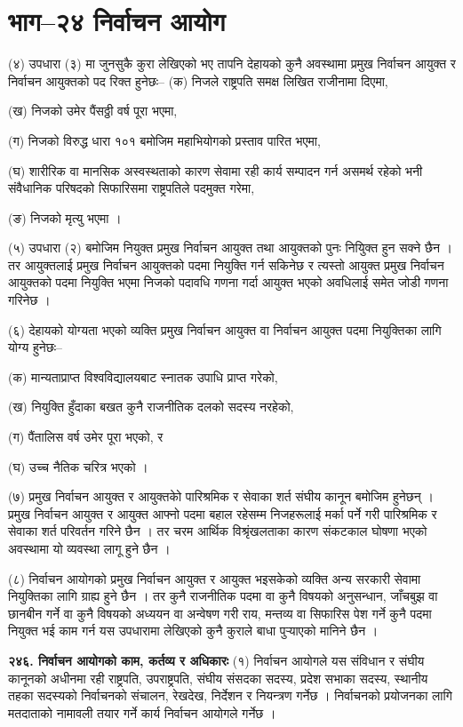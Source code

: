 \section{भाग–२४ निर्वाचन आयोग}

(४) उपधारा (३) मा जुनसुकै कुरा लेखिएको भए तापनि देहायको कुनै अवस्थामा प्रमुख निर्वाचन आयुक्त र निर्वाचन आयुक्तको पद रिक्त हुनेछः–
(क) निजले राष्ट्रपति समक्ष लिखित राजीनामा दिएमा,

(ख) निजको उमेर पैंसठ्ठी वर्ष पूरा भएमा,

(ग) निजको विरुद्ध धारा १०१ बमोजिम महाभियोगको प्रस्ताव पारित भएमा,

(घ) शारीरिक वा मानसिक अस्वस्थताको कारण सेवामा रही कार्य सम्पादन गर्न असमर्थ रहेको भनी संवैधानिक परिषदको
सिफारिसमा राष्ट्रपतिले पदमुक्त गरेमा,

(ङ) निजको मृत्यु भएमा ।

(५) उपधारा (२) बमोजिम नियुक्त प्रमुख निर्वाचन आयुक्त तथा आयुक्तको पुनः नियुिक्त हुन सक्ने छैन ।
तर आयुक्तलाई प्रमुख निर्वाचन आयुक्तको पदमा नियुक्ति गर्न सकिनेछ र त्यस्तो आयुक्त प्रमुख निर्वाचन आयुक्तको पदमा नियुक्ति भएमा निजको पदावधि गणना गर्दा आयुक्त भएको अवधिलाई समेत जोडी गणना गरिनेछ ।

(६) देहायको योग्यता भएको व्यक्ति प्रमुख निर्वाचन आयुक्त वा निर्वाचन आयुक्त पदमा नियुक्तिका लागि योग्य हुनेछः–

(क) मान्यताप्राप्त विश्वविद्यालयबाट स्नातक उपाधि प्राप्त गरेको,

(ख) नियुक्ति हुँदाका बखत कुनै राजनीतिक दलको सदस्य नरहेको,

(ग) पैंतालिस वर्ष उमेर पूरा भएको, र

(घ) उच्च नैतिक चरित्र भएको ।

(७) प्रमुख निर्वाचन आयुक्त र आयुक्तकोे पारिश्रमिक र सेवाका शर्त संघीय कानून बमोजिम हुनेछन् । प्रमुख निर्वाचन आयुक्त र आयुक्त आफ्नो पदमा बहाल रहेसम्म निजहरूलाई मर्का पर्ने गरी पारिश्रमिक र सेवाका शर्त परिवर्तन गरिने छैन ।
तर चरम आर्थिक विश्रृंखलताका कारण संकटकाल घोषणा भएको अवस्थामा यो व्यवस्था लागू हुने छैन ।

(८) निर्वाचन आयोगको प्रमुख निर्वाचन आयुक्त र आयुक्त भइसकेको व्यक्ति अन्य सरकारी सेवामा नियुक्तिका लागि ग्राह्य हुने छैन ।
तर कुनै राजनीतिक पदमा वा कुनै विषयको अनुसन्धान, जाँचबुझ वा छानबीन गर्ने वा कुनै विषयको अध्ययन वा अन्वेषण गरी राय, मन्तव्य वा सिफारिस पेश गर्ने कुनै पदमा नियुक्त भई काम गर्न यस उपधारामा लेखिएको कुनै कुराले बाधा पुर्‍याएको मानिने छैन ।

\textbf{२४६. निर्वाचन आयोगको काम, कर्तव्य र अधिकारः} (१) निर्वाचन आयोगले यस संविधान र संघीय कानूनको अधीनमा रही राष्ट्रपति, उपराष्ट्रपति, संघीय संसदका सदस्य, प्रदेश सभाका सदस्य, स्थानीय तहका सदस्यको निर्वाचनको संचालन, रेखदेख, निर्देशन र नियन्त्रण गर्नेछ । निर्वाचनको प्रयोजनका लागि मतदाताको नामावली तयार गर्ने कार्य निर्वाचन आयोगले गर्नेछ ।

